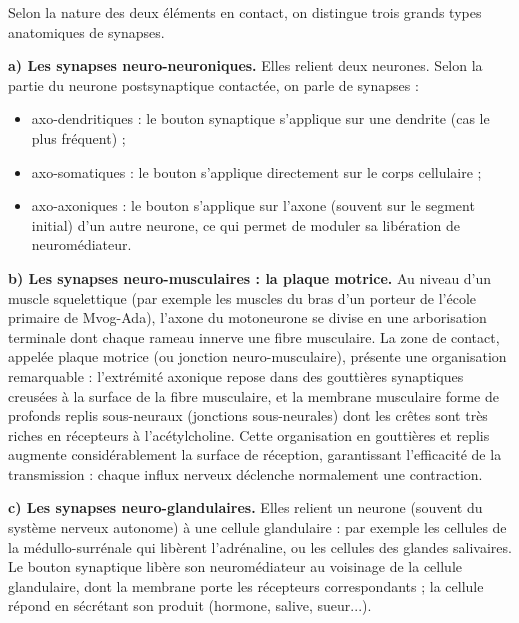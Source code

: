 \documentclass[11pt]{article}
\newcommand{\cle}[1]{{\popxbold\color{popdark}#1}}
\newcounter{popsec}
\newcounter{popsub}
\newcommand{\courssub}[1]{%
  \stepcounter{popsub}%
  \par\vspace{9pt}\noindent{\popxbold\fontsize{11.5}{13}\selectfont\color{popink}{\color{poporange}\thepopsec.\thepopsub}\hspace{6pt}#1}\par\nopagebreak\vspace{4pt}
}
\begin{document}
\courssub{Les types anatomiques de synapses}

Selon la nature des deux éléments en contact, on distingue trois grands types anatomiques de synapses.

\textbf{a) Les synapses neuro-neuroniques.} Elles relient deux neurones. Selon la partie du neurone postsynaptique contactée, on parle de synapses :
\begin{itemize}
\item \cle{axo-dendritiques} : le bouton synaptique s'applique sur une dendrite (cas le plus fréquent) ;
\item \cle{axo-somatiques} : le bouton s'applique directement sur le corps cellulaire ;
\item \cle{axo-axoniques} : le bouton s'applique sur l'axone (souvent sur le segment initial) d'un autre neurone, ce qui permet de moduler sa libération de neuromédiateur.
\end{itemize}

\textbf{b) Les synapses neuro-musculaires : la plaque motrice.} Au niveau d'un muscle squelettique (par exemple les muscles du bras d'un porteur de l'école primaire de Mvog-Ada), l'axone du motoneurone se divise en une \cle{arborisation terminale} dont chaque rameau innerve une fibre musculaire. La zone de contact, appelée \cle{plaque motrice} (ou jonction neuro-musculaire), présente une organisation remarquable : l'extrémité axonique repose dans des \cle{gouttières synaptiques} creusées à la surface de la fibre musculaire, et la membrane musculaire forme de profonds \cle{replis sous-neuraux} (jonctions sous-neurales) dont les crêtes sont très riches en \cle{récepteurs à l'acétylcholine}. Cette organisation en gouttières et replis augmente considérablement la surface de réception, garantissant l'efficacité de la transmission : chaque influx nerveux déclenche normalement une contraction.

\textbf{c) Les synapses neuro-glandulaires.} Elles relient un neurone (souvent du système nerveux autonome) à une \cle{cellule glandulaire} : par exemple les cellules de la médullo-surrénale qui libèrent l'adrénaline, ou les cellules des glandes salivaires. Le bouton synaptique libère son neuromédiateur au voisinage de la cellule glandulaire, dont la membrane porte les récepteurs correspondants ; la cellule répond en sécrétant son produit (hormone, salive, sueur...).
\end{document}
